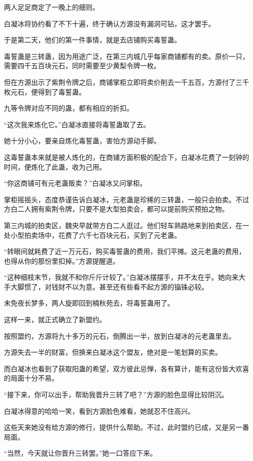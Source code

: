 \begin{this_body}
两人足足商定了一晚上的细则。

白凝冰将协约看了不下十遍，终于确认方源没有漏洞可钻，这才罢手。

于是第二天，他们的第一件事情，就是去店铺购买毒誓蛊。

毒誓蛊是三转蛊，因为用途广泛，在第三内城几乎每家商铺都有的卖。原价一只，需要四千五百块元石，同时需要至少黄梨令牌一枚。

但在方源出示了紫荆令牌之后，商铺掌柜立即将卖价削去一千五百，方源付了三千枚元石，便得到了毒誓蛊。

九等令牌对应不同的蛊，都有相应的折扣。

“这次我来炼化它。”白凝冰直接将毒誓蛊取了去。

她十分小心，要亲自炼化毒誓蛊，害怕方源动手脚。

这毒誓蛊本来就是被人炼化的，在商铺方面积极的配合下，白凝冰花费了一刻钟的时间，便炼化了此蛊，收为己用。

“你这商铺可有元老蛊贩卖？”白凝冰又问掌柜。

掌柜摇摇头，态度恭谨告诉白凝冰，元老蛊是珍稀的三转蛊，一般只会拍卖。不过方白二人拥有紫荆令牌，只要不是大型拍卖会，都可以提前购买预拍之物。

第三内城的拍卖区，魏央早就带方白二人逛过。他们轻车熟路地来到拍卖区，在一处小型拍卖场中，花费了六千七百块元石，买到了元老蛊。

“转眼间就耗费了近一万元石，购买毒誓蛊的费用，我们平摊。这元老蛊的费用，也得从你的那份里扣掉。”方源提醒道。

“这种细枝末节，我就不和你斤斤计较了。”白凝冰摆摆手，并不太在乎。她向来大手大脚惯了，对钱财不以为意。甚至还有些看不起方源的锱铢必较。

未免夜长梦多，两人旋即回到楠秋苑去，将毒誓蛊用了。

这样一来，就正式确立了新盟约。

按照盟约，方源将九十多万的元石，倒腾出一半，放到白凝冰的元老蛊里去。

方源失去一半的财富，但换来白凝冰这个盟友，绝对是一笔划算的买卖。

而白凝冰也看到了获取阳蛊的希望，双方彼此忌惮，各有算计，能有这份皆大欢喜的局面十分不易。

“接下来，你可以出手，帮助我晋升三转了吧？”方源的脸色显得比较阴沉。

白凝冰得意的哈哈一笑，看到方源脸色难看，她就忍不住高兴。

这些天来她没有给方源的修行，提供什么帮助。不过，此时盟约已成，又是另一番局面。

“当然，今天就让你晋升三转罢。”她一口答应下来。

\end{this_body}

